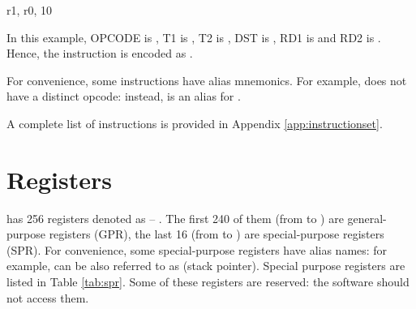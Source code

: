 \documentclass[a4paper,12pt,twoside,extrafontsizes]{memoir}
\begin{document}
\begin{codepar}
     r1, r0, 10
\end{codepar}

In this example, OPCODE is , T1 is , T2 is , DST is , RD1 is  and RD2 is . Hence, the instruction is encoded as .

For convenience, some instructions have alias mnemonics. For example, \lxp{} does not have a distinct  opcode: instead,  is an alias for .

A complete list of \lxp{} instructions is provided in Appendix \ref{app:instructionset}.

\section{Registers}

\lxp{} has 256 registers denoted as  -- . The first 240 of them (from  to ) are general-purpose registers (GPR), the last 16 (from  to ) are special-purpose registers (SPR). For convenience, some special-purpose registers have alias names: for example,  can be also referred to as  (stack pointer). Special purpose registers are listed in Table \ref{tab:spr}. Some of these registers are reserved: the software should not access them.
\end{document}
